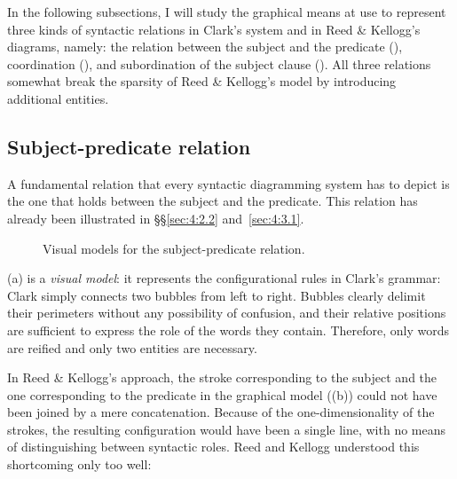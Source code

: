 \documentclass[english,output=paper,colorlinks,citecolor=brown]{../langscibook}
\begin{document}
In the following subsections, I will study the graphical means at use to represent three kinds of syntactic relations in Clark’s system and in Reed \& Kellogg’s diagrams, namely: the relation between the subject and the predicate (), coordination (), and subordination of the subject clause (). All three relations somewhat break the sparsity of Reed \& Kellogg’s model by introducing additional entities.

\subsection{Subject-predicate relation}\label{sec:4:4.1}

A fundamental relation that every syntactic dia\-gramming system has to depict is the one that holds between the subject and the predicate. This relation has already been illustrated in §§\ref{sec:4:2.2} and~\ref{sec:4:3.1}.

\begin{figure}
    \caption{Visual models for the subject-predicate relation.\label{fig:4:5}}
\end{figure}


(a) is a \textit{visual model}: it represents the configurational rules in Clark’s grammar: Clark simply connects two bubbles from left to right. Bubbles clearly delimit their perimeters without any possibility of confusion, and their relative positions are sufficient to express the role of the words they contain. Therefore, only words are reified and only two entities are necessary.

In Reed \& Kellogg’s approach, the stroke corresponding to the subject and the one corresponding to the predicate in the graphical model ((b)) could not have been joined by a mere concatenation. Because of the one-dimensionality of the strokes, the resulting configuration would have been a single line, with no means of distinguishing between syntactic roles. Reed and Kellogg understood this shortcoming only too well:
\end{document}
